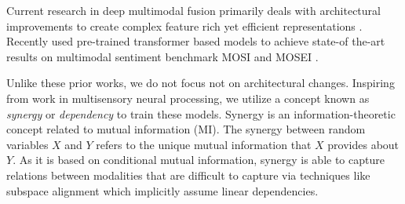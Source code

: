 \documentclass[letterpaper]{article} %
\begin{document}
Current research in deep multimodal fusion primarily deals with architectural improvements to create complex feature rich yet efficient representations \cite{zadeh2017tensor, liu2018efficient, hazarika2020misa}. Recently \cite{rahman2020integrating} used pre-trained transformer \citep{tsai2019multimodal, siriwardhana2020jointly} based models to achieve state-of the-art results on multimodal sentiment benchmark MOSI \cite{wollmer2013youtube} and MOSEI \cite{zadeh2018multimodal}.

Unlike these prior works, we do not focus not on architectural changes. Inspiring from work in multisensory neural processing, we utilize a concept known as \emph{synergy} or \emph{dependency} to train these models. Synergy is an information-theoretic concept related to mutual information (MI). The synergy between random variables $X$ and $Y$ refers to the unique mutual information that $X$ provides about $Y$. As it is based on conditional mutual information, synergy is able to capture relations between modalities that are difficult to capture via techniques like subspace alignment which implicitly assume linear dependencies.
\end{document}
